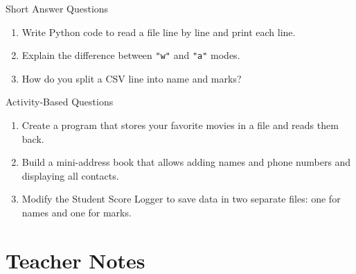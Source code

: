 \begin{exercise}{Short Answer Questions}
\begin{enumerate}
    \item Write Python code to read a file line by line and print each line.  
    \item Explain the difference between \texttt{"w"} and \texttt{"a"} modes.  
    \item How do you split a CSV line into name and marks?  
\end{enumerate}
\end{exercise}

\begin{exercise}{Activity-Based Questions}
\begin{enumerate}
    \item Create a program that stores your favorite movies in a file and reads them back.  
    \item Build a mini-address book that allows adding names and phone numbers and displaying all contacts.  
    \item Modify the Student Score Logger to save data in two separate files: one for names and one for marks.  
\end{enumerate}
\end{exercise}

\section{Teacher Notes}

